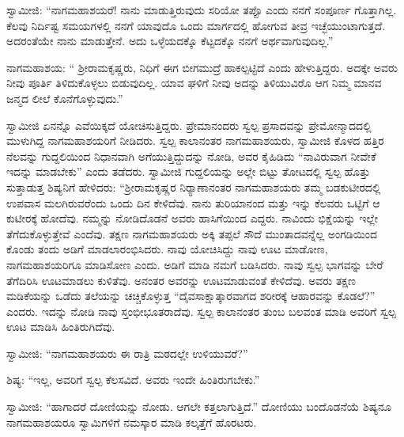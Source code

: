  ಸ್ವಾಮೀಜಿ: “ನಾಗಮಹಾಶಯರೆ! ನಾನು ಮಾಡುತ್ತಿರುವುದು ಸರಿಯೋ ತಪ್ಪೊ ಎಂದು ನನಗೆ ಸಂಪೂರ್ಣ ಗೊತ್ತಾಗಿಲ್ಲ. ಕೆಲವು ನಿರ್ದಿಷ್ಟ ಸಮಯಗಳಲ್ಲಿ ನನಗೆ ಯಾವುದೊ ಒಂದು ಮಾರ್ಗದಲ್ಲಿ ಹೋಗುವ ತೀವ್ರ ಇಚ್ಛೆಯುಂಟಾಗುತ್ತದೆ. ಅದರಂತೆಯೇ ನಾನು ಮಾಡುತ್ತೇನೆ. ಅದು ಒಳ್ಳೆಯದಕ್ಕೊ ಕೆಟ್ಟದಕ್ಕೊ ನನಗೆ ಅರ್ಥವಾಗುವುದಿಲ್ಲ.” 

 ನಾಗಮಹಾಶಯ: “ ಶ‍್ರೀರಾಮಕೃಷ್ಣರು, ನಿಧಿಗೆ ಈಗ ಬೀಗಮುದ್ರೆ ಹಾಕಲ್ಪಟ್ಟಿದೆ ಎಂದು ಹೇಳುತ್ತಿದ್ದರು. ಅದಕ್ಕೇ ಅವರು ನೀವು ಪೂರ್ತಿ ತಿಳಿದುಕೊಳ್ಳಲು ಬಿಡುವುದಿಲ್ಲ. ಯಾವ ಘಳಿಗೆ ನೀವು ಅದನ್ನು ತಿಳಿಯುವಿರೊ ಆಗ ನಿಮ್ಮ ಮಾನವ ಜನ್ಮದ ಲೀಲೆ ಕೊನೆಗೊಳ್ಳುವುದು.” 

 ಸ್ವಾಮೀಜಿ ಏನನ್ನೊ ಎವೆಯಿಕ್ಕದೆ ಯೋಚಿಸುತ್ತಿದ್ದರು. ಪ್ರೇಮಾನಂದರು ಸ್ವಲ್ಪ ಪ್ರಸಾದವನ್ನು ಪ್ರೇಮೋನ್ಮಾದದಲ್ಲಿ ಮುಳುಗಿದ್ದ ನಾಗಮಹಾಶಯರಿಗೆ ನೀಡಿದರು. ಸ್ವಲ್ಪ ಕಾಲಾನಂತರ ನಾಗಮಹಾಶಯರು, ಸ್ವಾಮೀಜಿ ಕೊಳದ ಹತ್ತಿರ ನೆಲವನ್ನು ಗುದ್ದಲಿಯಿಂದ ನಿಧಾನವಾಗಿ ಅಗೆಯುತ್ತಿದ್ದುದನ್ನು ನೋಡಿ, ಅವರ ಕೈಹಿಡಿದು “ನಾವಿರುವಾಗ ನೀವೇಕೆ ಇದನ್ನು ಮಾಡಬೇಕು” ಎಂದು ತಡೆದರು. ಸ್ವಾಮೀಜಿ ಗುದ್ದಲಿಯನ್ನು ಅಲ್ಲೇ ಬಿಟ್ಟು ತೋಟದಲ್ಲಿ ಸ್ವಲ್ಪ ಹೊತ್ತು ಸುತ್ತಾಡುತ್ತ ಶಿಷ್ಯನಿಗೆ ಹೇಳಿದರು: “ಶ‍್ರೀರಾಮಕೃಷ್ಣರ ನಿರ‍್ಯಾಣಾನಂತರ ನಾಗಮಹಾಶಯರು ತಮ್ಮ ಬಡಕುಟೀರದಲ್ಲಿ ಉಪವಾಸ ಮಲಗಿರುವರೆಂದು ಒಂದು ದಿನ ಕೇಳಿದೆವು. ನಾನು ತುರಿಯಾನಂದ ಮತ್ತು ಇನ್ನು ಕೆಲವರು ಒಟ್ಟಿಗೆ ಆ‌ ಕುಟೀರಕ್ಕೆ ಹೋದೆವು. ನಮ್ಮನ್ನು ನೋಡಿದೊಡನೆ ಅವರು ಹಾಸಿಗೆಯಿಂದ ಎದ್ದರು. ನಾವಿಂದು ಭಿಕ್ಷೆಯನ್ನು ಇಲ್ಲೇ ತೆಗೆದುಕೊಳ್ಳುತ್ತೇವೆ ಎಂದೆವು. ತಕ್ಷಣ ನಾಗಮಹಾಶಯರು ಅಕ್ಕಿ ತಪ್ಪಲೆ ಸೌದೆ ಮುಂತಾದವನ್ನೆಲ್ಲ ಅಂಗಡಿಯಿಂದ ಕೊಂಡು ತಂದು ಅಡಿಗೆ ಮಾಡಲಾರಂಭಿಸಿದರು. ನಾವು ಯೋಚಿಸಿದ್ದು ನಾವು ಊಟ ಮಾಡೋಣ, ನಾಗಮಹಾಶಯರಿಗೂ ಮಾಡಿಸೋಣ ಎಂದು. ಅಡಿಗೆ ಮಾಡಿ ನಮಗೆ ಬಡಿಸಿದರು. ನಾವು ಸ್ವಲ್ಪ ಭಾಗವನ್ನು ಬೇರೆ ತೆಗೆದಿರಿಸಿ ಊಟಮಾಡಲು ಕುಳಿತೆವು. ಅನಂತರ ಅವರನ್ನು ಊಟಮಾಡುವಂತೆ ಕೇಳಿದೆವು. ಅವರು ತಕ್ಷಣ ಮಡಿಕೆಯನ್ನು ಒಡೆದು ತಲೆಯನ್ನು ಚಚ್ಚಿಕೊಳ್ಳುತ್ತ “ದೈವಸಾಕ್ಷಾತ್ಕಾರವಾಗದ ಶರೀರಕ್ಕೆ ಆಹಾರವನ್ನು ಕೊಡಲೆ?” ಎಂದರು. ಇದನ್ನು ನೋಡಿ ನಾವು ಸ್ತಂಭೀಭೂತರಾದೆವು. ಸ್ವಲ್ಪ ಕಾಲಾನಂತರ ತುಂಬ ಬಲವಂತ ಮಾಡಿ ಅವರಿಗೆ ಸ್ವಲ್ಪ ಊಟ ಮಾಡಿಸಿ ಹಿಂತಿರುಗಿದೆವು. 

 ಸ್ವಾಮೀಜಿ: “ನಾಗಮಹಾಶಯರು ಈ ರಾತ್ರಿ ಮಠದಲ್ಲೇ ಉಳಿಯುವರೆ?” 

 ಶಿಷ್ಯ: “ಇಲ್ಲ, ಅವರಿಗೆ ಸ್ವಲ್ಪ ಕೆಲಸವಿದೆ. ಅವರು ಇಂದೇ ಹಿಂತಿರುಗಬೇಕು.” 

 ಸ್ವಾಮೀಜಿ: “ಹಾಗಾದರೆ ದೋಣಿಯನ್ನು ನೋಡು. ಆಗಲೇ ಕತ್ತಲಾಗುತ್ತಿದೆ.” ದೋಣಿಯು ಬಂದೊಡನೆಯೆ ಶಿಷ್ಯನೂ ನಾಗಮಹಾಶಯರೂ ಸ್ವಾಮಿಗಳಿಗೆ ನಮಸ್ಕಾರ ಮಾಡಿ ಕಲ್ಕತ್ತೆಗೆ ಹೊರಟರು. 

